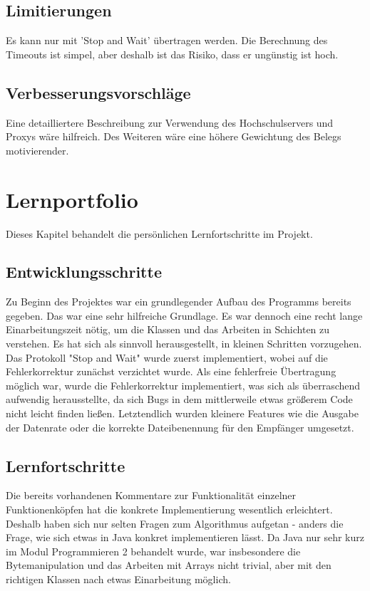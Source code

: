 \documentclass{article}
\begin{document}
\subsection{Limitierungen}
Es kann nur mit 'Stop and Wait' übertragen werden. Die Berechnung des Timeouts ist simpel, aber deshalb ist das Risiko, dass er ungünstig ist hoch. 

\subsection{Verbesserungsvorschläge}
Eine detailliertere Beschreibung zur Verwendung des Hochschulservers und Proxys wäre hilfreich. Des Weiteren wäre eine höhere Gewichtung des Belegs motivierender.
\newpage

\section{Lernportfolio}
Dieses Kapitel behandelt die persönlichen Lernfortschritte im Projekt. 

\subsection{Entwicklungsschritte}
Zu Beginn des Projektes war ein grundlegender Aufbau des Programms bereits gegeben. Das war eine sehr hilfreiche Grundlage. Es war dennoch eine recht lange Einarbeitungszeit nötig, um die Klassen und das Arbeiten in Schichten zu verstehen. Es hat sich als sinnvoll herausgestellt, in kleinen Schritten vorzugehen. Das Protokoll "Stop and Wait" wurde zuerst implementiert, wobei auf die Fehlerkorrektur zunächst verzichtet wurde. Als eine fehlerfreie Übertragung möglich war, wurde die Fehlerkorrektur implementiert, was sich als überraschend aufwendig herausstellte, da sich Bugs in dem mittlerweile etwas größerem Code nicht leicht finden ließen. Letztendlich wurden kleinere Features wie die Ausgabe der Datenrate oder die korrekte Dateibenennung für den Empfänger umgesetzt.   

\subsection{Lernfortschritte}
Die bereits vorhandenen Kommentare zur Funktionalität einzelner Funktionenköpfen hat die konkrete Implementierung wesentlich erleichtert. Deshalb haben sich nur selten Fragen zum Algorithmus aufgetan - anders die Frage, wie sich etwas in Java konkret implementieren lässt. Da Java nur sehr kurz im Modul Programmieren 2 behandelt wurde, war insbesondere die Bytemanipulation und das Arbeiten mit Arrays nicht trivial, aber mit den richtigen Klassen nach etwas Einarbeitung möglich.
\end{document}
